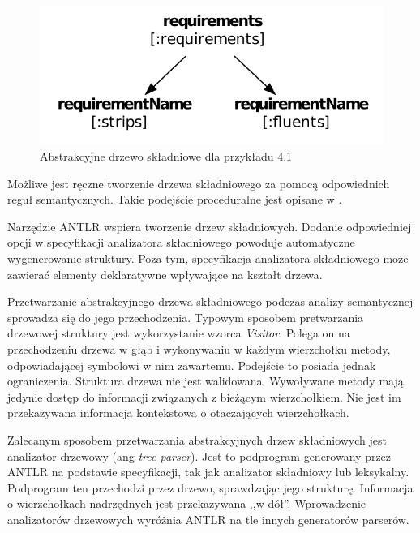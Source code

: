 \begin{figure}[h!]
  \centering
    \includegraphics[scale=0.8]{img/antlr_ast.pdf}
    \caption{Abstrakcyjne drzewo składniowe dla przykładu 4.1} %
    \label{antlr_ast}
\end{figure}


Możliwe jest ręczne tworzenie drzewa składniowego za pomocą odpowiednich
reguł semantycznych. Takie podejście proceduralne jest opisane w \cite{compilers}.

Narzędzie ANTLR wspiera tworzenie drzew składniowych. Dodanie
odpowiedniej opcji w specyfikacji analizatora składniowego powoduje automatyczne
wygenerowanie struktury. Poza tym, specyfikacja analizatora składniowego
 może zawierać elementy deklaratywne wpływające na kształt drzewa.


Przetwarzanie abstrakcyjnego drzewa składniowego podczas analizy semantycznej
sprowadza się do jego przechodzenia. Typowym sposobem pretwarzania drzewowej struktury 
jest wykorzystanie wzorca \emph{Visitor}. Polega on na przechodzeniu drzewa w głąb
i wykonywaniu w każdym wierzchołku metody, odpowiadającej symbolowi w nim zawartemu.
Podejście to posiada jednak ograniczenia. Struktura drzewa nie jest walidowana.
Wywoływane metody mają jedynie dostęp do informacji związanych z bieżącym wierzchołkiem.
Nie jest im przekazywana informacja kontekstowa o otaczających wierzchołkach.

Zalecanym sposobem przetwarzania abstrakcyjnych drzew składniowych jest analizator drzewowy
(ang \emph{tree parser}). Jest to podprogram generowany przez
ANTLR na podstawie specyfikacji, tak jak analizator składniowy lub leksykalny.
Podprogram ten przechodzi przez drzewo, sprawdzając jego strukturę. Informacja o wierzchołkach
nadrzędnych jest przekazywana ,,w dół''. Wprowadzenie analizatorów drzewowych 
wyróżnia ANTLR na tle innych generatorów parserów. 

